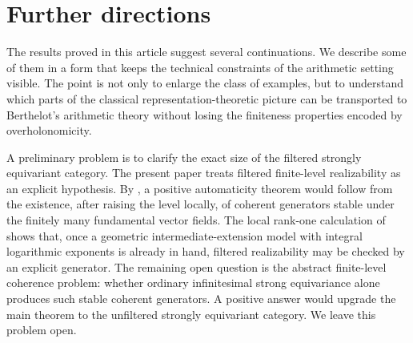 \documentclass[11pt]{amsart}
\theoremstyle{plain}
\theoremstyle{definition}
\theoremstyle{remark}
\begin{document}
\section{Further directions}
\label{sec:further-directions}

The results proved in this article suggest several continuations.  We describe
some of them in a form that keeps the technical constraints of the arithmetic
setting visible.  The point is not only to enlarge the class of examples, but
to understand which parts of the classical representation-theoretic picture can
be transported to Berthelot's arithmetic theory without losing the finiteness
properties encoded by overholonomicity.

A preliminary problem is to clarify the exact size of the filtered strongly
equivariant category.  The present paper treats filtered finite-level
realizability as an explicit hypothesis.  By ,
a positive automaticity theorem would follow from the existence, after raising
the level locally, of coherent generators stable under the finitely many
fundamental vector fields.  The local rank-one calculation of
 shows that, once a geometric
intermediate-extension model with integral logarithmic exponents is already in
hand, filtered realizability may be checked by an explicit generator.  The
remaining open question is the abstract finite-level coherence problem: whether
ordinary infinitesimal strong equivariance alone produces such stable coherent
generators.  A positive answer would upgrade the main theorem to the unfiltered
strongly equivariant category.  We leave this problem open.
\end{document}
